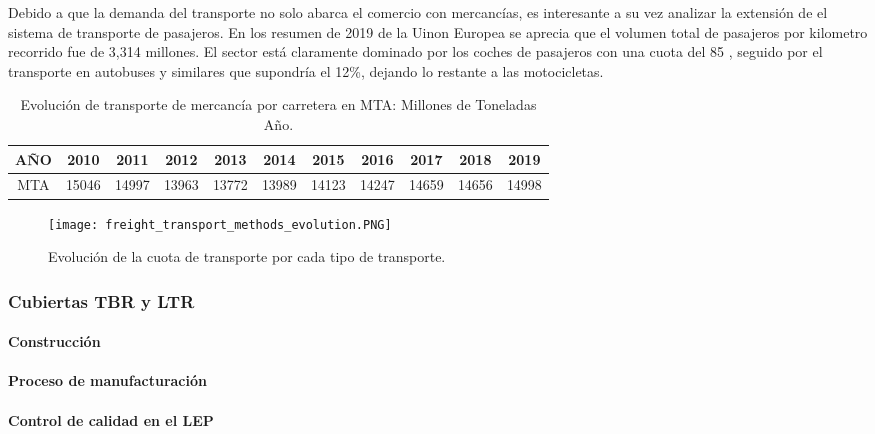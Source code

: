 \documentclass[12pt]{article}
\begin{document}
Debido a que la demanda del transporte no solo abarca el comercio con mercancías, es interesante a su vez analizar la extensión de el sistema de transporte de pasajeros. En los resumen de 2019 de la Uinon Europea se aprecia que el volumen total de pasajeros por kilometro recorrido fue de 3,314 millones. El sector está claramente dominado por los coches de pasajeros con una cuota del 85 , seguido por el transporte en autobuses y similares que supondría el 12\%, dejando lo restante a las motocicletas. 

\begin{table}[h!]
\centering
\begin{tabular}{|c|cccccccccc|}

	\hline
	AÑO & 2010 & 2011 & 2012 & 2013 & 2014 & 2015 & 2016 & 2017 & 2018 & 2019\\ 
	\hline
	MTA & 15046 & 14997 & 13963 & 13772 & 13989 & 14123 & 14247 & 14659 & 14656 & 14998\\ 
	\hline
	
\end{tabular}

\caption{Evolución de transporte de mercancía por carretera en MTA: Millones de Toneladas Año.}
\label{table:1}

\end{table}

\begin{figure}
    \begin{center}
        \texttt{[image: freight\_transport\_methods\_evolution.PNG]}    
    \end{center}
    \caption{Evolución de la cuota de transporte por cada tipo de transporte.}
\end{figure}

\subsubsection{Cubiertas TBR y LTR}

\paragraph{Construcción}

\paragraph{Proceso de manufacturación}

\paragraph{Control de calidad en el LEP}
\end{document}
